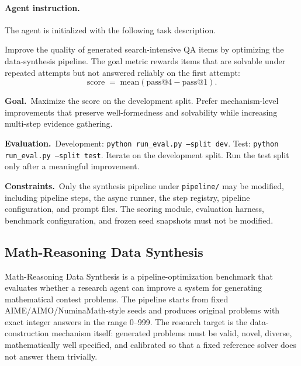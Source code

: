 \documentclass{llmxive}
\begin{document}
\paragraph{Agent instruction.}
The agent is initialized with the following task description.

\begin{promptbox}[title=\textbf{Search-Agent Data Synthesis Task Instruction}]
Improve the quality of generated search-intensive QA items by optimizing
the data-synthesis pipeline.
The goal metric rewards items that are solvable under repeated attempts but
not answered reliably on the first attempt:
\[
\mathrm{score}
\;=\;
\mathrm{mean}(\mathrm{pass@4} - \mathrm{pass@1}).
\]

\smallskip
\noindent\textbf{Goal.}~Maximize the score on the development split.
Prefer mechanism-level improvements that preserve well-formedness and
solvability while increasing multi-step evidence gathering.

\smallskip
\noindent\textbf{Evaluation.}~Development: \texttt{python run\_eval.py --split dev}.
Test: \texttt{python run\_eval.py --split test}.
Iterate on the development split. Run the test split only after a
meaningful improvement.

\smallskip
\noindent\textbf{Constraints.}~Only the synthesis pipeline under
\texttt{pipeline/} may be modified, including pipeline steps, the async
runner, the step registry, pipeline configuration, and prompt files.
The scoring module, evaluation harness, benchmark configuration, and
frozen seed snapshots must not be modified.
\end{promptbox}

\subsection{Math-Reasoning Data Synthesis}
\label{app:benchmark-math-reasoning-data}
\label{app:math-case-study}

Math-Reasoning Data Synthesis is a pipeline-optimization benchmark that
evaluates whether a research agent can improve a system for generating
mathematical contest problems.
The pipeline starts from fixed AIME/AIMO/NuminaMath-style seeds and produces
original problems with exact integer answers in the range 0--999.
The research target is the data-construction mechanism itself: generated
problems must be valid, novel, diverse, mathematically well specified, and
calibrated so that a fixed reference solver does not answer them trivially.
\end{document}
